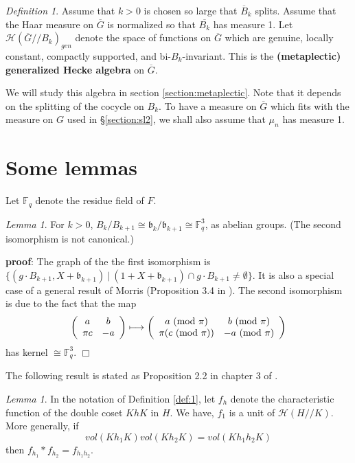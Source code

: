 \documentclass[12pt,letterpaper]{amsart}
\theoremstyle{definition}
\theoremstyle{remark}
\newtheorem{lemma}[theorem]{Lemma}
\newtheorem{definition}[theorem]{Definition}
\begin{document}
\begin{definition} Assume that $k>0$ is chosen so large that
$\overline{B}_k$ splits. Assume that the Haar measure on
$\overline{G}$ is normalized so that $\overline{B_k}$ has 
measure 1. Let $\mathcal{H}(\overline{G}//B_k)_{gen}$
denote the space of functions on $\overline{G}$ which
are genuine, locally constant, compactly supported, and 
bi-$B_k$-invariant.
This is the {\bf (metaplectic) generalized Hecke algebra} 
on $\overline{G}$.
\end{definition}

We will study this algebra 
in section \ref{section:metaplectic}. Note that it
depends on the splitting of the cocycle on
$B_k$. To have a measure on $\overline{G}$ which fits
with the measure on $G$ used in \S \ref{section:sl2},
we shall also assume that $\mu_n$ has measure 1.

\section{Some lemmas}

Let ${\mathbb{F}}_q$ denote the residue field of $F$.

\begin{lemma} For $k>0$,
$B_k/B_{k+1}\cong {\mathfrak{b}}_k/{\mathfrak{b}}_{k+1}
\cong {\mathbb F}_q^3$, 
as abelian groups. (The second isomorphism is
not canonical.)
\end{lemma}

{\bf proof}:
The graph of the the first isomorphism is 
$\{(g\cdot B_{k+1},X+ {\mathfrak{b}}_{k+1})\ |\ 
(1+X+{\mathfrak{b}}_{k+1})\cap g\cdot B_{k+1}\not= 
\emptyset\}$. It is also a special case of
a general result of Morris (Proposition 3.4 in \cite{M}). 
The second isomorphism is due to the fact that
the map
\[
\left(
\begin{array}{cc}
a & b\\
\pi c & -a
\end{array}
\right)\longmapsto
\left(
\begin{array}{cc}
a\ ({\rm mod}\ \pi) & b\ ({\rm mod}\ \pi)\\
\pi (c\ ({\rm mod}\ \pi)) & -a \ ({\rm mod}\ \pi)
\end{array}
\right)
\]
has kernel $\cong {\mathbb F}_q^3$. $\Box$

The following result is stated as Proposition 2.2 in 
chapter 3 of \cite{H}. 

\begin{lemma} In the notation of Definition \ref{def:1},
let $f_h$ denote the characteristic function of the 
double coset $K h K$ in $H$. We have,
$f_1$ is a unit of $\mathcal{H}(H//K)$. More generally,
if
\[
vol(Kh_1K)vol(Kh_2K)=vol(Kh_1h_2K)
\]
then $f_{h_1}*f_{h_2}=f_{h_1h_2}$.
\label{lemma:general}
\end{lemma}
\end{document}
